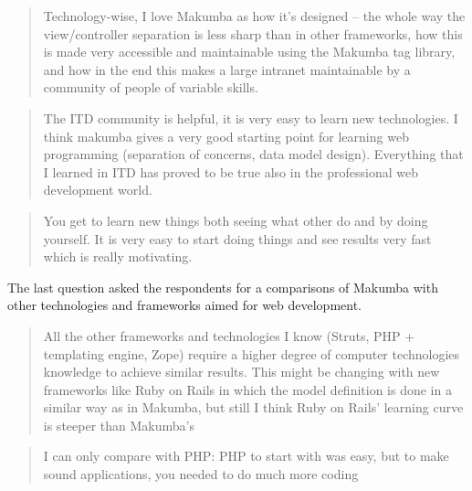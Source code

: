 \documentclass{acm_proc_article-sp}
\begin{document}
\begin{quotation}
	Technology-wise, I love Makumba as how it's designed -- the whole way the view/controller separation is less sharp than in other frameworks, how this is made very accessible and maintainable using the Makumba tag library, and how in the end this makes a large intranet maintainable by a community of people of variable skills. 
\end{quotation}

\begin{quotation}
	The ITD community is helpful, it is very easy to learn new technologies. I think makumba gives a very good starting point for learning web programming (separation of concerns, data model design). Everything that I learned in ITD has proved to be true also in the professional web development world. 
\end{quotation}

\begin{quotation}
	You get to learn new things both seeing what other do and by doing yourself. It is very easy to start doing things and see results very fast which is really motivating. 
\end{quotation}


The last question asked the respondents for a comparisons of Makumba with other technologies and frameworks aimed for web development.

\begin{quotation}
	All the other frameworks and technologies I know (Struts, PHP + templating engine, Zope) require a higher degree of computer technologies knowledge to achieve similar results. This might be changing with new frameworks like Ruby on Rails in which the model definition is done in a similar way as in Makumba, but still I think Ruby on Rails' learning curve is steeper than Makumba's 
\end{quotation}

\begin{quotation}
	I can only compare with PHP: PHP to start with was easy, but to make sound applications, you needed to do much more coding 
\end{quotation}

\end{document}
